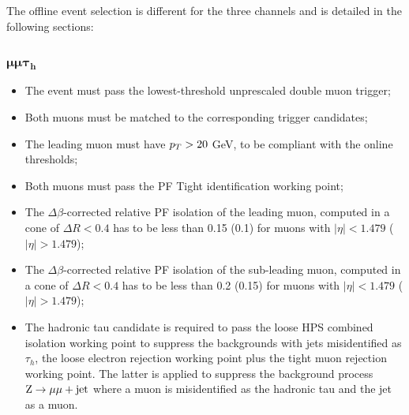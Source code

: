 The offline event selection is different for the three channels and is detailed in the following sections:

\subsubsection{$\boldsymbol{\mu\mu\tau_h}$}
\begin{itemize}
\item The event must pass the lowest-threshold unprescaled double muon trigger;
\item Both muons must be matched to the corresponding trigger candidates;
\item The leading muon must have $p_{T} > 20$ GeV, to be compliant with the online thresholds;
\item Both muons must pass the PF Tight identification working point;
\item The $\Delta \beta$-corrected relative PF isolation of the leading muon, computed in a cone of $\Delta R < 0.4$ has to be less than 0.15 (0.1) for muons with $|\eta| < 1.479$ ($|\eta| > 1.479$);
\item The $\Delta \beta$-corrected relative PF isolation of the sub-leading muon, computed in a cone of $\Delta R < 0.4$ has to be less than 0.2 (0.15) for muons with $|\eta| < 1.479$ ($|\eta| > 1.479$);
\item The hadronic tau candidate is required to pass the loose HPS combined isolation working point to suppress the backgrounds with jets misidentified as $\tau_h$, the loose electron rejection working point plus the tight muon rejection working point. The latter is applied to suppress the background process $\mathrm{Z}\rightarrow\mu\mu+\mathrm{jet}$ where a muon is misidentified as the hadronic tau and the jet as a muon.
\end{itemize}

